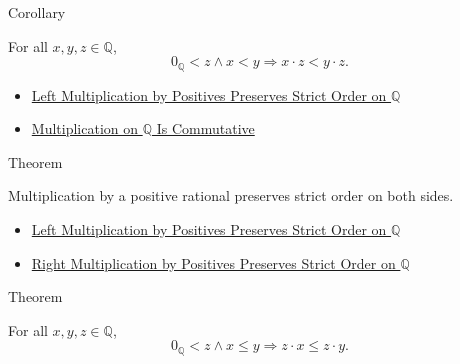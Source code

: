 \begin{corollarybox}{Corollary}
\begin{corollary}
\label{cor:right-positive-multiplication-preserves-strict-order-on-q}
For all $x,y,z\in\mathbb{Q}$,
\[
0_{\mathbb{Q}}<z\land x<y
\Longrightarrow
x\cdot z<y\cdot z.
\]
\end{corollary}
\end{corollarybox}

\begin{dependencies}
\begin{itemize}
  \item \hyperref[thm:left-positive-multiplication-preserves-strict-order-on-q]{Left Multiplication by Positives Preserves Strict Order on $\mathbb{Q}$}
  \item \hyperref[thm:multiplication-on-q-commutative]{Multiplication on $\mathbb{Q}$ Is Commutative}
\end{itemize}
\end{dependencies}

\begin{theorembox}{Theorem}
\begin{theorem}
\label{thm:positive-multiplication-preserves-strict-order-on-q}
Multiplication by a positive rational preserves strict order on both sides.
\end{theorem}
\end{theorembox}

\begin{dependencies}
\begin{itemize}
  \item \hyperref[thm:left-positive-multiplication-preserves-strict-order-on-q]{Left Multiplication by Positives Preserves Strict Order on $\mathbb{Q}$}
  \item \hyperref[cor:right-positive-multiplication-preserves-strict-order-on-q]{Right Multiplication by Positives Preserves Strict Order on $\mathbb{Q}$}
\end{itemize}
\end{dependencies}

\begin{theorembox}{Theorem}
\begin{theorem}
\label{thm:left-positive-multiplication-preserves-order-on-q}
For all $x,y,z\in\mathbb{Q}$,
\[
0_{\mathbb{Q}}<z\land x\le y
\Longrightarrow
z\cdot x\le z\cdot y.
\]
\end{theorem}
\end{theorembox}

